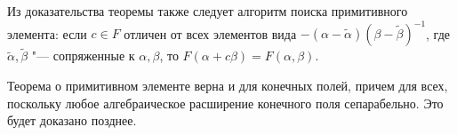 \begin{note}
	Из доказательства теоремы также следует алгоритм поиска примитивного элемента: если $c \in F$ отличен от всех элементов вида $-(\alpha - \widetilde{\alpha})(\beta - \widetilde{\beta})^{-1}$, где $\widetilde{\alpha}, \widetilde{\beta}$ "--- сопряженные к $\alpha, \beta$, то $F(\alpha + c\beta) = F(\alpha, \beta)$.
\end{note}

\begin{note}
	Теорема о примитивном элементе верна и для конечных полей, причем для всех, поскольку любое алгебраическое расширение конечного поля сепарабельно. Это будет доказано позднее.
\end{note}